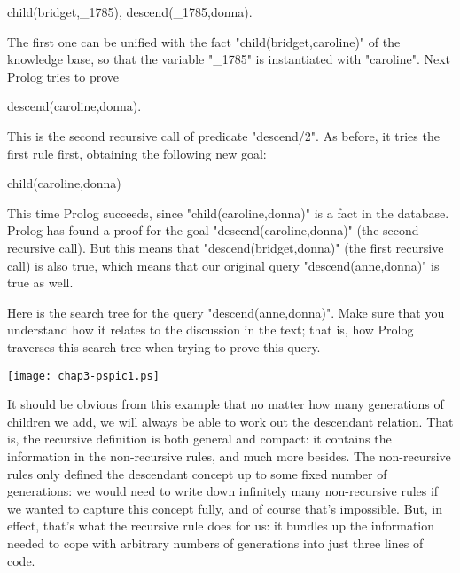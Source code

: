 \begin{LPNcodedisplay}
child(bridget,_1785),
descend(_1785,donna).
\end{LPNcodedisplay}


The first one can be unified with the fact
"child(bridget,caroline)" of the knowledge base, so that the
variable "_1785" is instantiated with "caroline". Next Prolog
tries to prove

\begin{LPNcodedisplay}
descend(caroline,donna).
\end{LPNcodedisplay}
This is the second recursive call of predicate "descend/2".
As before, it tries the first rule first, obtaining the following new
goal:

\begin{LPNcodedisplay}
child(caroline,donna)
\end{LPNcodedisplay}


This time Prolog succeeds, since "child(caroline,donna)" is a
fact in the database. Prolog has found a proof for the goal
"descend(caroline,donna)" (the second recursive call). But this
means that "descend(bridget,donna)" (the first recursive call)
is also true, which means that our original query
"descend(anne,donna)" is true as well.

Here is the search tree for the query
"descend(anne,donna)". Make sure that you understand how it
relates to the discussion in the text; that is, how Prolog
traverses this search tree when trying to prove this query.

\begin{center}
\texttt{[image: chap3-pspic1.ps]}
\end{center}

\bigskip
\bigskip
\bigskip
\medskip

It should be obvious from this example that no matter how many
generations of children we add, we will always be able to work out the
descendant relation. That is, the recursive definition is both general
and compact: it contains  the information in the
non-recursive rules, and much more besides.  The non-recursive rules
only defined the descendant concept up to some fixed number of
generations: we would need to write down infinitely many non-recursive
rules if we wanted to capture this concept fully, and of course that's
impossible.  But, in effect, that's what the recursive rule does for
us: it bundles up the information needed to cope with arbitrary
numbers of generations into just three lines of code.

